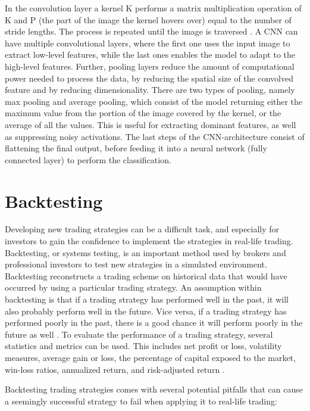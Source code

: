 \indent\newline 
In the convolution layer a kernel K performs a matrix multiplication operation of K and P (the part of the image the kernel hovers over) equal to the number of stride lengths. The process is repeated until the image is traversed \cite{saha}. A CNN can have multiple convolutional layers, where the first one uses the input image to extract low-level features, while the last ones enables the model to adapt to the high-level features. Further, pooling layers reduce the amount of computational power needed to process the data, by reducing the spatial size of the convolved feature and by reducing dimensionality. There are two types of pooling, namely max pooling and average pooling, which consist of the model returning either the maximum value from the portion of the image covered by the kernel, or the average of all the values\cite{saha}. This is useful for extracting dominant features, as well as suppressing noisy activations. The last steps of the CNN-architecture consist of flattening the final output, before feeding it into a neural network (fully connected layer) to perform the classification.   

\section{Backtesting}
Developing new trading strategies can be a difficult task, and especially for investors to gain the confidence to implement the strategies in real-life trading. Backtesting, or systems testing, is an important method used by brokers and professional investors to test new strategies in a simulated environment. Backtesting reconstructs a trading scheme on historical data that would have occurred by using a particular trading strategy. An assumption within backtesting is that if a trading strategy has performed well in the past, it will also probably perform well in the future. Vice versa, if a trading strategy has performed poorly in the past, there is a good chance it will perform poorly in the future as well \cite{ni}.  To evaluate the performance of a trading strategy, several statistics and metrics can be used. This includes net profit or loss, volatility measures, average gain or loss, the percentage of capital exposed to the market, win-loss ratios, annualized return, and risk-adjusted return \cite{kuepper}. 

\indent\newline
Backtesting trading strategies comes with several potential pitfalls that can cause a seemingly successful strategy to fail when applying it to real-life trading: 

